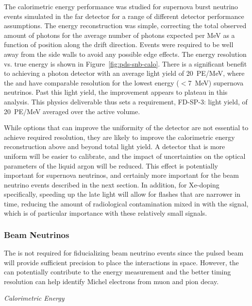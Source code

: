 The calorimetric energy performance was studied for supernova burst neutrino events simulated in the far detector for a range of different detector performance assumptions. The energy reconstruction was simple, correcting the total observed amount of photons for the average number of photons expected per MeV as a function of position along the drift direction. Events were required to be well away from the side walls to avoid any possible edge effects. The energy resolution vs. true energy is shown in Figure~\ref{fig:pds-snb-calo}. There is a significant benefit to achieving a photon detector with an average light yield of \SI{20}{PE/MeV}, where the  and  have comparable resolution for the lowest energy ($<$\SI{7}{MeV}) supernova neutrinos. Past this light yield, the improvement appears to plateau in this analysis. This physics deliverable thus sets a requirement, FD-SP-3: light yield, of \SI{20}{PE/MeV} averaged over the active volume.

While options that can improve the uniformity of the detector are not essential to achieve required resolution, they are likely to improve the calorimetric energy reconstruction above and beyond total light yield. A detector that is more uniform will be easier to calibrate, and the impact of uncertainties on the optical parameters of the liquid argon will be reduced. This effect is potentially important for supernova neutrinos, and certainly more important for the beam neutrino events described in the next section. In addition, for Xe-doping specifically, speeding up the late light will allow for flashes that are narrower in time, reducing the amount of radiological contamination mixed in with the signal, which is of particular importance with these relatively small signals.



\subsubsection{Beam Neutrinos}
\label{subsec:fdsp-pd-simphys-beam}

The  is not required for fiducializing beam neutrino events since the pulsed beam will provide sufficient precision to place the interactions in space. However, the  can potentially contribute to the energy measurement and the better timing resolution can help identify Michel electrons from muon and pion decay.


\textit{\it Calorimetric Energy}\nopagebreak


